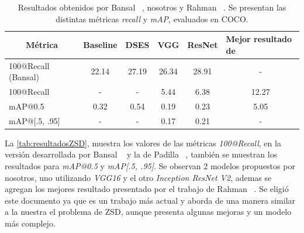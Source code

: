 \begin{table}[H]
	\centering
	\resizebox{\textwidth}{!} {
		\begin{tabular}{|l|c|c|c|c|c|}
			\hline
			\multicolumn{1}{|c|}{{Métrica}} & {Baseline \cite{bansal2018zero}} & \multicolumn{1}{l|}{{DSES \cite{bansal2018zero}}} & {VGG} & { ResNet} & \multicolumn{1}{l|}{{Mejor resultado de \cite{rahman2020zero}}} \\ \hline
			100@Recall (Bansal)             & 22.14                            & 27.19                                             & 26.34              & 28.91                 & -                                                               \\ \hline
			100@Recall                      & -                                & -                                                 & 5.44               & 6.38                  & 12.27                                                           \\ \hline
			mAP@0.5                         & 0.32                             & 0.54                                              & 0.19               & 0.23                  & 5.05                                                            \\ \hline
			mAP@[.5, .95]                   & -                                & -                                                 & 0.17               & 0.21                  & -                                                               \\ \hline
		\end{tabular}
	}
	\caption{Resultados obtenidos por Bansal \etal~\cite{bansal2018zero}, nosotros y Rahman \etal~\cite{rahman2020zero}. Se presentan las distintas métricas \textit{recall} y \textit{mAP}, evaluados en COCO.}
	\label{tab:resultadosZSD}
\end{table}


La \autoref{tab:resultadosZSD}, muestra los valores de las métricas \textit{100@Recall}, en la versión desarrollada por Bansal \etal~\cite{bansal2018zero} y la de Padilla \etal~\cite{padilla2020survey}, también se muestran los resultados para \textit{mAP@0.5} y \textit{mAP[.5, .95]}. Se observan 2 modelos propuestos por nosotros, uno utilizando \textit{VGG16} y el otro \textit{Inception ResNet V2}, ademas se agregan los mejores resultado presentado por el trabajo de Rahman \etal~\cite{rahman2020zero}. Se eligió este documento ya que es un trabajo más actual y aborda de una manera similar a la nuestra el problema de ZSD, aunque presenta algunas mejoras y un modelo más complejo.\\


